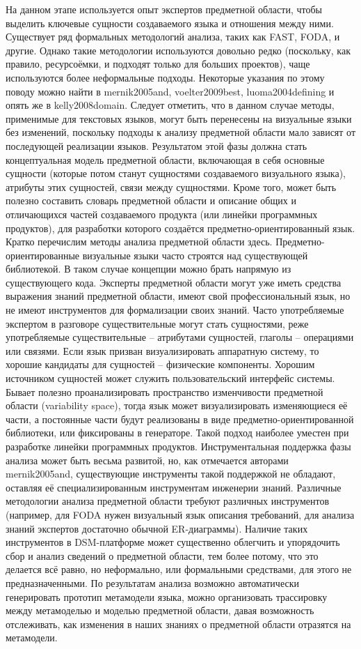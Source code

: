 На данном этапе используется опыт экспертов предметной области, чтобы выделить ключевые сущности создаваемого языка и отношения между ними. Существует ряд формальных методологий анализа, таких как FAST, FODA, и другие. Однако такие методологии используются довольно редко (поскольку, как правило, ресурсоёмки, и подходят только для больших проектов), чаще используются более неформальные подходы. Некоторые указания по этому поводу можно найти в mernik2005and, voelter2009best, luoma2004defining и опять же в kelly2008domain. Следует отметить, что в данном случае методы, применимые для текстовых языков, могут быть перенесены на визуальные языки без изменений, поскольку подходы к анализу предметной области мало зависят от последующей реализации языков. Результатом этой фазы должна стать концептуальная модель предметной области, включающая в себя основные сущности (которые потом станут сущностями создаваемого визуального языка), атрибуты этих сущностей, связи между сущностями. Кроме того, может быть полезно составить словарь предметной области и описание общих и отличающихся частей создаваемого продукта (или линейки программных продуктов), для разработки которого создаётся предметно-ориентированный язык.
Кратко перечислим методы анализа предметной области здесь.
Предметно-ориентированные визуальные языки часто строятся над существующей библиотекой. В таком случае концепции можно брать напрямую из существующего кода.
Эксперты предметной области могут уже иметь средства выражения знаний предметной области, имеют свой профессиональный язык, но не имеют инструментов для формализации своих знаний. Часто употребляемые экспертом в разговоре существительные могут стать сущностями, реже употребляемые существительные – атрибутами сущностей, глаголы – операциями или связями. 
Если язык призван визуализировать аппаратную систему, то хорошие кандидаты для сущностей – физические компоненты.
Хорошим источником сущностей может служить пользовательский интерфейс системы.
Бывает полезно проанализировать пространство изменчивости предметной области (variability space), тогда язык может визуализировать изменяющиеся её части, а постоянные части будут реализованы в виде предметно-ориентированной библиотеки, или фиксированы в генераторе. Такой подход наиболее уместен при разработке линейки программных продуктов.
	Инструментальная поддержка фазы анализа может быть весьма развитой, но, как отмечается авторами mernik2005and, существующие инструменты такой поддержкой не обладают, оставляя её специализированным инструментам инженерии знаний. Различные методологии анализа предметной области требуют различных инструментов (например, для FODA нужен визуальный язык описания требований, для анализа знаний экспертов достаточно обычной ER-диаграммы). Наличие таких инструментов в DSM-платформе может существенно облегчить и упорядочить сбор и анализ сведений о предметной области, тем более потому, что это делается всё равно, но неформально, или формальными средствами, для этого не предназначенными. По результатам анализа возможно автоматически генерировать прототип метамодели языка, можно организовать трассировку между метамоделью и моделью предметной области, давая возможность отслеживать, как изменения в наших знаниях о предметной области отразятся на метамодели.
